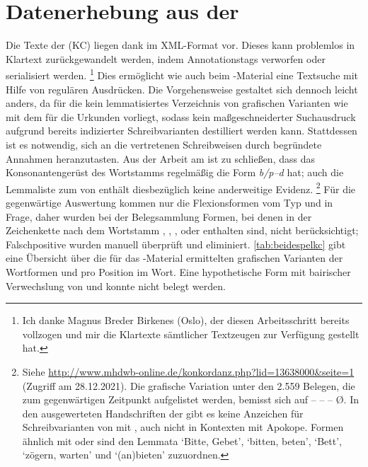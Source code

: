 
\section{Datenerhebung aus der }

Die Texte der \KC{} (KC) liegen dank 
\autocite{kcdigital} im XML-Format vor. Dieses kann problemlos in Klartext
zurückgewandelt werden, indem Annotationstags verworfen oder serialisiert
werden.%
%
	\footnote{Ich danke Magnus Breder Birkenes (Oslo), der diesen Arbeitsschritt
	bereits vollzogen und mir die Klartexte sämtlicher Textzeugen zur Verfügung
	gestellt hat.}
%
Dies ermöglicht wie auch beim \CAO{}-Material eine Textsuche mit Hilfe
von regulären Ausdrücken. Die Vorgehensweise gestaltet sich dennoch leicht
anders, da für die \KC{} kein lemmatisiertes Verzeichnis von grafischen
Varianten wie mit dem \WMU{} für die Urkunden vorliegt, sodass kein
maßgeschneiderter Suchausdruck aufgrund bereits indizierter Schreibvarianten
destilliert werden kann. Stattdessen ist es notwendig, sich an die vertretenen
Schreibweisen durch begründete Annahmen heranzutasten. Aus der Arbeit am
\CAO{} ist zu schließen, dass das Konsonantengerüst des Wortstamms
regelmäßig die Form \textit{b/p--d} hat; auch die Lemmaliste zum
 von \citeauthor{mwb1}
\autocite[\pno~]{mwb1} enthält diesbezüglich keine anderweitige
Evidenz.%
%
	\footnote{Siehe
		\url{http://www.mhdwb-online.de/konkordanz.php?lid=13638000&seite=1}
		(Zugriff am 28.12.2021). Die grafische Variation unter den 2.559
		Belegen, die zum gegenwärtigen Zeitpunkt aufgelistet werden, bemisst
		sich auf  --  --
		 -- 
		Ø. In den ausgewerteten Handschriften der \KC{} gibt es keine Anzeichen
		für Schreibvarianten von  mit , auch nicht in
		Kontexten mit Apokope. Formen ähnlich  mit  oder
		 sind den Lemmata  `Bitte, Gebet',
		 `bitten, beten',  `Bett',
		 `zögern, warten' und  `(an)bieten'
		zuzuordnen.}
%
Für die gegenwärtige Auswertung kommen nur die Flexionsformen vom Typ 
und  in Frage, daher wurden bei der Belegsammlung Formen, bei denen
in der Zeichenkette nach dem Wortstamm , , , 
oder  enthalten sind, nicht berücksichtigt; Falschpositive wurden
manuell überprüft und eliminiert. \cref{tab:beidespelkc} gibt eine Übersicht
über die für das \KC{}-Material ermittelten grafischen Varianten der
Wortformen  und  pro Position im Wort. Eine
hypothetische Form  mit bairischer Verwechslung von  und
 \autocite[153]{paul2007} konnte nicht belegt werden.

